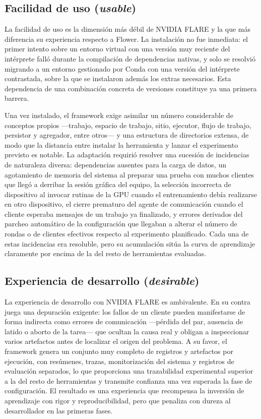 \subsection{Facilidad de uso (\textit{usable})}\label{sec:usab-flare-usable}

La facilidad de uso es la dimensión más débil de NVIDIA FLARE y la que más diferencia su
experiencia respecto a Flower. La instalación no fue inmediata: el primer intento sobre un
entorno virtual con una versión muy reciente del intérprete falló durante la compilación de
dependencias nativas, y solo se resolvió migrando a un entorno gestionado por Conda con una
versión del intérprete contrastada, sobre la que se instalaron además los extras necesarios.
Esta dependencia de una combinación concreta de versiones constituye ya una primera barrera.

Una vez instalado, el framework exige asimilar un número considerable de conceptos propios
—trabajo, espacio de trabajo, sitio, ejecutor, flujo de trabajo, persistor y agregador,
entre otros— y una estructura de directorios extensa, de modo que la distancia entre instalar
la herramienta y lanzar el experimento previsto es notable. La adaptación requirió resolver
una sucesión de incidencias de naturaleza diversa: dependencias ausentes para la carga de
datos, un agotamiento de memoria del sistema al preparar una prueba con muchos clientes que
llegó a derribar la sesión gráfica del equipo, la selección incorrecta de dispositivo al
invocar rutinas de la GPU cuando el entrenamiento debía realizarse en otro dispositivo, el
cierre prematuro del agente de comunicación cuando el cliente esperaba mensajes de un trabajo
ya finalizado, y errores derivados del parcheo automático de la configuración que llegaban a
alterar el número de rondas o de clientes efectivos respecto al experimento planificado. Cada
una de estas incidencias era resoluble, pero su acumulación sitúa la curva de aprendizaje
claramente por encima de la del resto de herramientas evaluadas.

\subsection{Experiencia de desarrollo (\textit{desirable})}\label{sec:usab-flare-desirable}

La experiencia de desarrollo con NVIDIA FLARE es ambivalente. En su contra juega una
depuración exigente: los fallos de un cliente pueden manifestarse de forma indirecta como
errores de comunicación —pérdida del par, ausencia de latido o aborto de la tarea— que
ocultan la causa real y obligan a inspeccionar varios artefactos antes de localizar el
origen del problema. A su favor, el framework genera un conjunto muy completo de registros y
artefactos por ejecución, con resúmenes, trazas, monitorización del sistema y registros de
evaluación separados, lo que proporciona una trazabilidad experimental superior a la del
resto de herramientas y transmite confianza una vez superada la fase de configuración. El
resultado es una experiencia que recompensa la inversión de aprendizaje con rigor y
reproducibilidad, pero que penaliza con dureza al desarrollador en las primeras fases.

